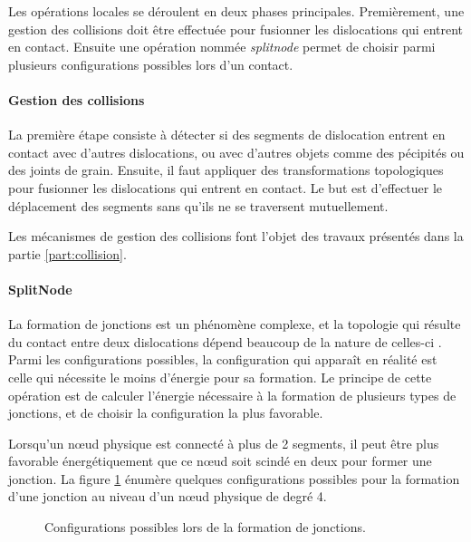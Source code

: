 \documentclass[11pt,class=article,float=false,crop=false]{standalone}
\begin{document}
Les opérations locales se déroulent en deux phases principales. Premièrement, une gestion des collisions doit être effectuée pour fusionner les dislocations qui entrent en contact. Ensuite une opération nommée \textit{splitnode} permet de choisir parmi plusieurs configurations possibles lors d'un contact.

\paragraph{Gestion des collisions}

La première étape consiste à détecter si des segments de dislocation entrent en contact avec d'autres dislocations, ou avec d'autres objets comme des pécipités ou des joints de grain. Ensuite, il faut appliquer des transformations topologiques pour fusionner les dislocations qui entrent en contact. Le but est d’effectuer le déplacement des segments sans qu'ils ne se traversent mutuellement.

Les mécanismes de gestion des collisions font l'objet des travaux présentés dans la partie \ref{part:collision}.

\paragraph{SplitNode}

La formation de jonctions est un phénomène complexe, et la topologie qui résulte du contact entre deux dislocations dépend beaucoup de la nature de celles-ci . Parmi les configurations possibles, la configuration qui apparaît en réalité est celle qui nécessite le moins d'énergie pour sa formation. Le principe de cette opération est de calculer l'énergie nécessaire à la formation de plusieurs types de jonctions, et de choisir la configuration la plus favorable.

Lorsqu'un nœud physique est connecté à plus de 2 segments, il peut être plus favorable énergétiquement que ce nœud soit scindé en deux pour former une jonction. La figure \ref{fig:configurations_jonctions} énumère quelques configurations possibles pour la formation d'une jonction au niveau d'un nœud physique de degré 4.

\begin{figure}[H]
	\centering
	\caption{Configurations possibles lors de la formation de jonctions.}
	\label{fig:configurations_jonctions}
\end{figure}
\end{document}
